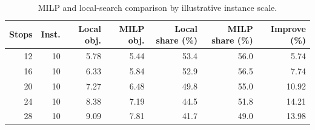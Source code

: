 \begin{table}[htbp]
\centering
\small
\caption{MILP and local-search comparison by illustrative instance scale.}
\label{tab:small_scale_milp_vs_local}
\begin{tabular}{rrrrrrr}
\toprule
Stops & Inst. & Local obj. & MILP obj. & Local share (\%) & MILP share (\%) & Improve (\%) \\
\midrule
12 & 10 & 5.78 & 5.44 & 53.4 & 56.0 & 5.74 \\
16 & 10 & 6.33 & 5.84 & 52.9 & 56.5 & 7.74 \\
20 & 10 & 7.27 & 6.48 & 49.8 & 55.0 & 10.92 \\
24 & 10 & 8.38 & 7.19 & 44.5 & 51.8 & 14.21 \\
28 & 10 & 9.09 & 7.81 & 41.7 & 49.0 & 13.98 \\
\bottomrule
\end{tabular}
\end{table}
